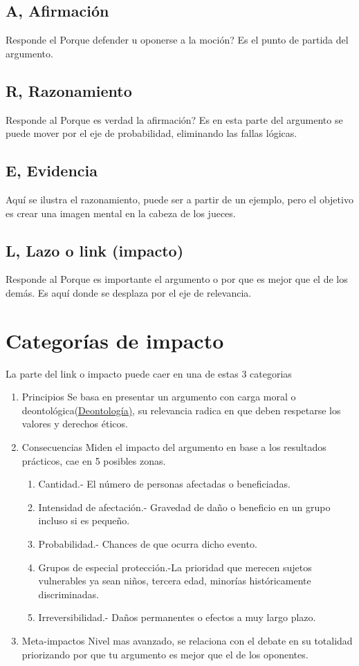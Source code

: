 \documentclass[11pt]{article}
\begin{document}
\subsection{A, Afirmación}
\label{sec:org65a9a46}
Responde el Porque defender u oponerse a la moción?
Es el punto de partida del argumento.
\subsection{R, Razonamiento}
\label{sec:org25416df}
Responde al Porque es verdad la afirmación?
Es en esta parte del argumento se puede mover por el eje de
probabilidad, eliminando las fallas lógicas.
\subsection{E, Evidencia}
\label{sec:org301ecbe}
Aquí se ilustra el razonamiento, puede ser a partir de un ejemplo,
pero el objetivo es crear una imagen mental en la cabeza de los jueces. 
\subsection{L, Lazo o link (impacto)}
\label{sec:org8733887}
Responde al Porque es importante el argumento o por que es mejor que
el de los demás. Es aquí donde se desplaza por el eje de relevancia. 
\section{Categorías de impacto}
\label{sec:org866bea9}
La parte del link o impacto puede caer en una de estas 3 categorias
\begin{enumerate}
\item Principios
Se basa en presentar un argumento con carga moral o
deontológica(\href{../Deontología.org}{Deontología)}, su relevancia radica en que deben
respetarse los valores y derechos éticos.
\item Consecuencias
Miden el impacto del argumento en base a los resultados prácticos,
cae en 5 posibles zonas.
\begin{enumerate}
\item Cantidad.- El número de personas afectadas o beneficiadas.
\item Intensidad de afectación.- Gravedad de daño o beneficio en un
grupo incluso si es pequeño.
\item Probabilidad.- Chances de que ocurra dicho evento.
\item Grupos de especial protección.-La prioridad que merecen sujetos
vulnerables ya sean niños, tercera edad, minorías históricamente
discriminadas.
\item Irreversibilidad.- Daños permanentes o efectos a muy largo
plazo.
\end{enumerate}
\item Meta-impactos
Nivel mas avanzado, se relaciona con el debate en su totalidad
priorizando por que tu argumento es mejor que el de los oponentes.
\end{enumerate}
\end{document}
